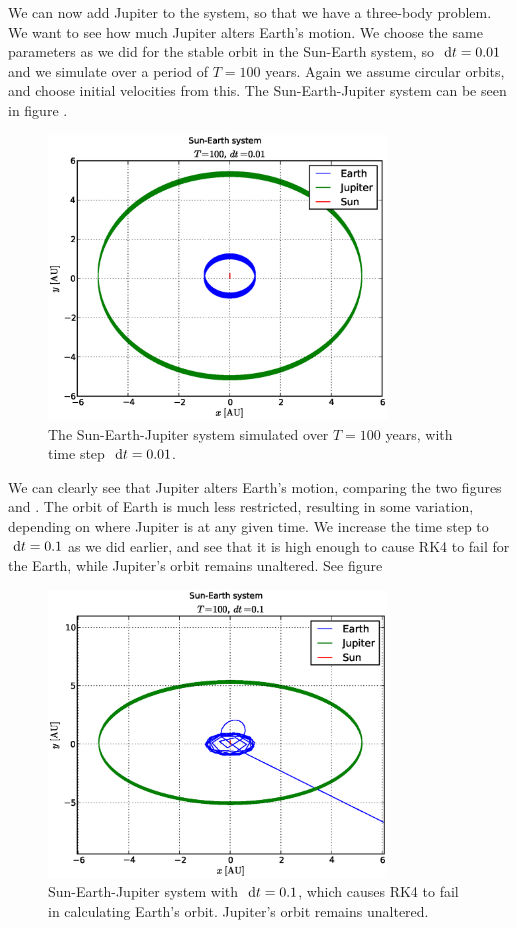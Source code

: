
We can now add Jupiter to the system, so that we have a three-body problem. We
want to see how much Jupiter alters Earth's motion. We choose the same
parameters as we did for the stable orbit in the Sun-Earth system, so $\ \mathrm{d}t =
0.01$ and we simulate over a period of $T = 100$ years. Again we assume circular
orbits, and choose initial velocities from this. The Sun-Earth-Jupiter
system can be seen in figure .
%
\begin{figure}[htpb]
	\centering
	\includegraphics[width=0.8\textwidth]{figures/sun_earth_jupiter_dt1e-2}
	\caption{The Sun-Earth-Jupiter system simulated over $T = 100$ years, with
	time step $\ \mathrm{d}t = 0.01$.}
	\label{fig:sunEarthJupiter}
\end{figure}
%
We can clearly see that Jupiter alters Earth's motion, comparing the two
figures  and . The orbit of Earth
is much less restricted, resulting in some variation, depending on where Jupiter
is at any given time. We increase the time step to $\ \mathrm{d}t = 0.1$ as
we did earlier, and see that it is high enough to cause RK4 to fail for the
Earth, while Jupiter's orbit remains unaltered. See figure
%
\begin{figure}[htpb]
	\centering
	\includegraphics[width=0.8\textwidth]{figures/sun_earth_jupiter_dt1e-1}
	\caption{Sun-Earth-Jupiter system with $\ \mathrm{d}t = 0.1$, which causes RK4 to fail
	in calculating Earth's orbit. Jupiter's orbit remains unaltered.}
	\label{fig:sunEarthJupiter-dt1e-2}
\end{figure}
